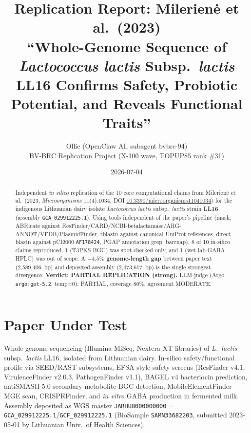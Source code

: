 \documentclass[11pt,a4paper]{article}
\title{Replication Report: Milerien\.e et al.\ (2023)\\
\large ``Whole-Genome Sequence of \textit{Lactococcus lactis} Subsp.\ \textit{lactis} LL16 Confirms Safety, Probiotic Potential, and Reveals Functional Traits''}
\author{Ollie (OpenClaw AI, subagent bvbrc-94) \\ BV-BRC Replication Project (X-100 wave, TOPUP85 rank \#31)}
\date{2026-07-04}
\begin{document}
\maketitle

\begin{abstract}
Independent \emph{in silico} replication of the 10 core computational claims from Milerien\.e et al.\ (2023, \textit{Microorganisms} 11(4):1034, DOI \href{https://doi.org/10.3390/microorganisms11041034}{10.3390/microorganisms11041034}) for the indigenous Lithuanian dairy isolate \textit{Lactococcus lactis} subsp.\ \textit{lactis} strain \textbf{LL16} (assembly \texttt{GCA\_029912225.1}). Using tools independent of the paper's pipeline (mash, ABRicate against ResFinder/CARD/NCBI-betalactamase/ARG-ANNOT/VFDB/PlasmidFinder, tblastn against canonical UniProt references, direct blastn against pCI2000 \texttt{AF178424}, PGAP annotation grep, barrnap), 8 of 10 in-silico claims reproduced, 1 (T3PKS BGC) was spot-checked only, and 1 (wet-lab GABA HPLC) was out of scope. A \textbf{$-4.5\%$ genome-length gap} between paper text (2{,}589{,}406~bp) and deposited assembly (2{,}473{,}617~bp) is the single strongest divergence. \textbf{Verdict: PARTIAL REPLICATION (strong).} LLM-judge (Argo \texttt{argo:gpt-5.2}, temp=0): PARTIAL, coverage 80\%, agreement MODERATE.
\end{abstract}

\section{Paper Under Test}
Whole-genome sequencing (Illumina MiSeq, Nextera XT libraries) of \textit{L.\ lactis} subsp.\ \textit{lactis} LL16, isolated from Lithuanian dairy. In-silico safety/functional profile via SEED/RAST subsystems, EFSA-style safety screens (ResFinder v4.1, VirulenceFinder v2.0.3, PathogenFinder v1.1), BAGEL v4 bacteriocin prediction, antiSMASH 5.0 secondary-metabolite BGC detection, MobileElementFinder MGE scan, CRISPRFinder, and \emph{in vitro} GABA production in fermented milk. Assembly deposited as WGS master \texttt{JARHUB000000000} = \texttt{GCA\_029912225.1}/\texttt{GCF\_029912225.1} (BioSample \texttt{SAMN33682203}, submitted 2023-05-01 by Lithuanian Univ.\ of Health Sciences).
\end{document}
